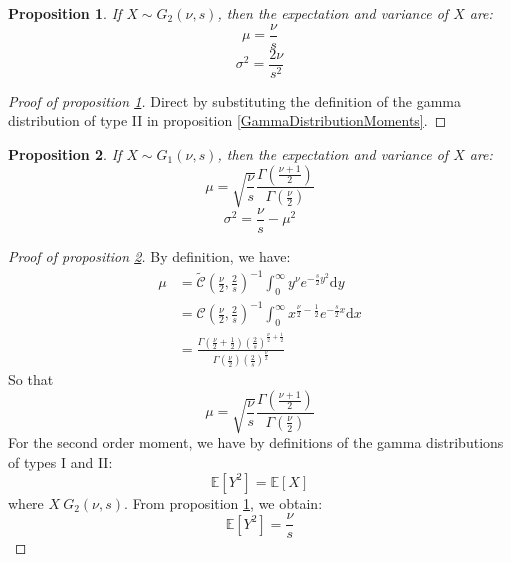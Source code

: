 \documentclass{amsart}
\theoremstyle{plain}
\newtheorem{proposition}{Proposition}[section]
\theoremstyle{remark}
\numberwithin{equation}{section}
\begin{document}
\begin{proposition}
   \label{GammaDistribution:type2:moments}
   If $X\sim G_2(\nu, s)$, then the expectation and variance of $X$ are:
   \[
     \mu = \frac{\nu}{s}
   \]
   \[
     \sigma^2 = \frac{2\nu}{s^2}
   \]
 \end{proposition}

 \begin{proof}[Proof of proposition \ref{GammaDistribution:type2:moments}]
   Direct by substituting the definition of the gamma distribution of type II in proposition \ref{GammaDistributionMoments}.
 \end{proof}

\begin{proposition}
   \label{GammaDistribution:type1:moments}
   If $X\sim G_1(\nu, s)$, then the expectation and variance of $X$ are:
   \[
     \mu = \sqrt{\frac{\nu}{s}}\frac{\Gamma\left(\frac{\nu+1}{2}\right)}{\Gamma\left(\frac{\nu}{2}\right)}
   \]
   \[
     \sigma^2 = \frac{\nu}{s} - \mu^2
   \]
 \end{proposition}

 \begin{proof}[Proof of proposition \ref{GammaDistribution:type1:moments}]
By definition, we have:
\[
  \begin{split}
    \mu &= \widetilde{\mathcal C}\left(\frac{\nu}{2},\frac{2}{s}\right)^{-1}\int_0^{\infty}y^{\nu}e^{-\frac{s}{2}y^2}\mathrm dy\\
    &=\mathcal C\left(\frac{\nu}{2},\frac{2}{s}\right)^{-1}\int_{0}^{\infty}x^{\frac{\nu}{2}-\frac{1}{2}}e^{-\frac{s}{2}x}\mathrm d x\\
    &= \frac{\Gamma\left(\frac{\nu}{2}+\frac{1}{2}\right)\left(\frac{2}{s}\right)^{\frac{\nu}{2}+\frac{1}{2}}}{\Gamma\left(\frac{\nu}{2}\right)\left(\frac{2}{s}\right)^{\frac{\nu}{2}}}
  \end{split}
\]
So that
\[
\mu = \sqrt{\frac{\nu}{s}}\frac{\Gamma\left(\frac{\nu+1}{2}\right)}{\Gamma\left(\frac{\nu}{2}\right)}
\]
For the second order moment, we have by definitions of the gamma distributions of types I and II:
\[
\mathbb E\left[Y^2\right] = \mathbb E [X]
\]
where $X~G_2(\nu, s)$. From proposition \ref{GammaDistribution:type2:moments}, we obtain:
\[
\mathbb E\left[Y^2\right] = \frac{\nu}{s}
\]
 \end{proof}
\end{document}
